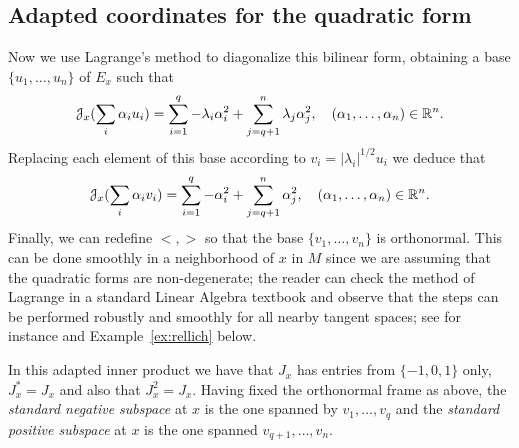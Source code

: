 \documentclass[12pt,reqno]{amsart}
\numberwithin{equation}{section}
\theoremstyle{plain}
\theoremstyle{definition}
\newcommand{\RR}{{\mathbb R}}
\newcommand{\J}{\EuScript{J}}
\begin{document}
\subsection{Adapted coordinates for the quadratic form}
\label{sec:adapted-coordin-quad}

Now we use Lagrange's method to
diagonalize this bilinear form, obtaining a base
$\{u_1,\dots,u_n\}$ of $E_x$ such that
\begin{align*}
  \J_x(\sum_{i}\alpha_iu_i)=\sum_{i=1}^q -\lambda_i\alpha_i^2 +
  \sum_{j=q+1}^n \lambda_j\alpha_j^2, \quad
  (\alpha_1,\dots,\alpha_n)\in\RR^n.
\end{align*}
Replacing each element of
this base according to $v_i=|\lambda_i|^{1/2}u_i$ we deduce that
\begin{align*}
\J_x(\sum_{i}\alpha_iv_i)=\sum_{i=1}^q -\alpha_i^2 +
  \sum_{j=q+1}^n \alpha_j^2, \quad
  (\alpha_1,\dots,\alpha_n)\in\RR^n.
\end{align*}
Finally, we can redefine $<,>$ so that the base
$\{v_1,\dots, v_n\}$ is orthonormal. This can be done
smoothly in a neighborhood of $x$ in $M$ since we are
assuming that the quadratic forms are non-degenerate; the
reader can check the method of Lagrange in a standard Linear
Algebra textbook and observe that the steps can be performed
robustly and smoothly for all nearby tangent spaces; see for
instance \cite{ShafRemiz,Postnikov2} and
Example~\ref{ex:rellich} below.


In this adapted inner product we have that $J_x$ has entries
from $\{-1,0,1\}$ only, $J_x^*=J_x$ and also that
$J_x^2=J_x$.
Having fixed the orthonormal frame as above, the
\emph{standard negative subspace} at $x$ is the one spanned
by $v_{1},\dots, v_{q}$ and the \emph{standard positive
  subspace} at $x$ is the one spanned $v_{q+1},\dots,v_n$.
\end{document}
